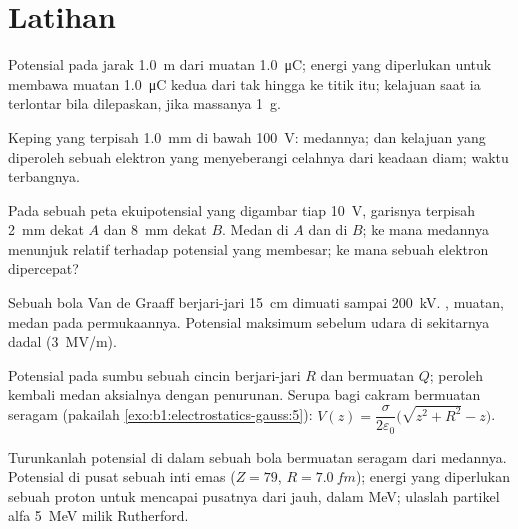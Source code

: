 \section{Latihan}

\begin{exercise}[$\star$]\label{exo:b1:potential-capacitors:1}
Potensial pada jarak \qty{1.0}{m} dari muatan \qty{1.0}{\micro C}; energi yang
diperlukan untuk membawa muatan \qty{1.0}{\micro C} kedua dari tak hingga ke
titik itu; kelajuan saat ia terlontar bila dilepaskan, jika massanya \qty{1}{g}.
\end{exercise}

\begin{exercise}[$\star$]\label{exo:b1:potential-capacitors:2}
Keping yang terpisah \qty{1.0}{mm} di bawah \qty{100}{V}: medannya;  dan kelajuan yang diperoleh sebuah elektron yang menyeberangi celahnya
dari keadaan diam; waktu terbangnya.
\end{exercise}

\begin{exercise}[$\star$]\label{exo:b1:potential-capacitors:3}
Pada sebuah peta ekuipotensial yang digambar tiap \qty{10}{V}, garisnya
terpisah \qty{2}{mm} dekat $A$ dan \qty{8}{mm} dekat $B$. Medan di $A$
dan di $B$; ke mana medannya menunjuk relatif terhadap potensial yang
membesar; ke mana sebuah elektron dipercepat?
\end{exercise}

\begin{exercise}[$\star$]\label{exo:b1:potential-capacitors:4}
Sebuah bola Van de Graaff berjari-jari \qty{15}{cm} dimuati sampai \qty{200}{kV}.
, muatan, medan pada permukaannya. Potensial maksimum sebelum
udara di sekitarnya dadal (\qty{3}{MV/m}).
\end{exercise}

\begin{exercise}[$\star\star$]\label{exo:b1:potential-capacitors:5}
Potensial pada sumbu sebuah cincin berjari-jari $R$ dan bermuatan $Q$; peroleh
kembali medan aksialnya dengan penurunan. Serupa bagi cakram bermuatan seragam
(pakailah \cref{exo:b1:electrostatics-gauss:5}): $V(z) = \dfrac{\sigma}{2\varepsilon_0}
\bigl(\sqrt{z^2 + R^2} - z\bigr)$.
\end{exercise}

\begin{exercise}[$\star\star$]\label{exo:b1:potential-capacitors:6}
Turunkanlah potensial di dalam sebuah bola bermuatan seragam dari medannya.
Potensial di pusat sebuah inti emas ($Z = 79$, $R = \qty{7.0}{fm}$);
energi yang diperlukan sebuah proton untuk mencapai pusatnya dari jauh, dalam
\unit{MeV}; ulaslah partikel alfa \qty{5}{MeV} milik Rutherford.
\end{exercise}

